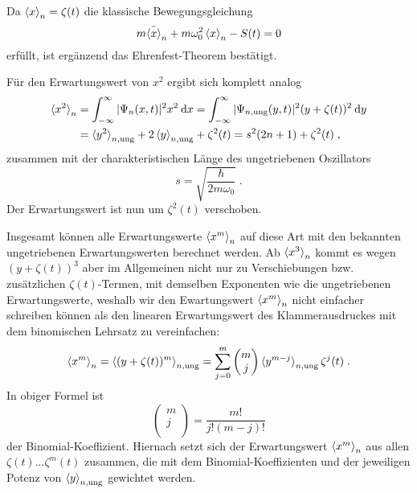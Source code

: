     Da $\braket{x}_n=\zeta(t)$ die klassische Bewegungsgleichung
    \begin{equation}
      m\ddot{\braket{x}}_n + m\omega_0^2\braket{x}_n - S(t) = 0
    \end{equation}
    erfüllt, ist ergänzend das Ehrenfest-Theorem bestätigt.

    Für den Erwartungswert von $x^2$ ergibt sich komplett analog
    \begin{align}
      \braket{x^2}_n &= \int_{-\infty}^{\infty} |\Psi_n(x,t)|^2 x^2 \: \text dx
      = \int_{-\infty}^{\infty} |\Psi_{n,\text{ung}}(y,t)|^2 (y+\zeta(t))^2 \: \text dy \notag \\
      &= \braket{y^2}_{n,\text{ung}} + 2\braket{y}_{n,\text{ung}} + \zeta^2(t)
      = s^2(2n+1) + \zeta^2(t) \; ,
      \label{erwartungswert_x^2_einzelner}
    \end{align}
    zusammen mit der charakteristischen Länge des ungetriebenen Oszillators
    \begin{equation}
      s = \sqrt{\frac{\hbar}{2m\omega_0}} \; .
      \label{charak_laenge}
    \end{equation}
    Der Erwartungswert ist nun um $\zeta^2(t)$ verschoben.

    Insgesamt können alle Erwartungswerte $\braket{x^m}_n$ auf diese Art mit den bekannten ungetriebenen Erwartungswerten berechnet werden.
    Ab $\braket{x^3}_n$ kommt es wegen $(y+\zeta(t))^3$ aber im Allgemeinen nicht nur zu Verschiebungen bzw. zusätzlichen $\zeta(t)$-Termen, mit demselben Exponenten wie die ungetriebenen Erwartungswerte, weshalb wir den Ewartungswert $\braket{x^m}_n$ nicht einfacher schreiben können als den linearen Erwartungswert des Klammerausdruckes mit dem binomischen Lehrsatz zu vereinfachen:
    \begin{equation}
      \braket{x^m}_n = \braket{(y+\zeta(t))^m}_{n,\text{ung}} = \sum_{j=0}^m \begin{pmatrix} m \\ j \\ \end{pmatrix} \braket{y^{m-j}}_{n,\text{ung}}\zeta^j(t) \; .
    \end{equation}
    In obiger Formel ist
    \begin{equation}
      \begin{pmatrix} m \\ j \\ \end{pmatrix} = \frac{m!}{j!(m-j)!}
    \end{equation}
    der Binomial-Koeffizient.
    Hiernach setzt sich der Erwartungswert $\braket{x^m}_n$ aus allen $\zeta(t)...\zeta^m(t)$ zusammen, die mit dem Binomial-Koeffizienten und der jeweiligen Potenz von $\braket{y}_{n,\text{ung}}$ gewichtet werden.


